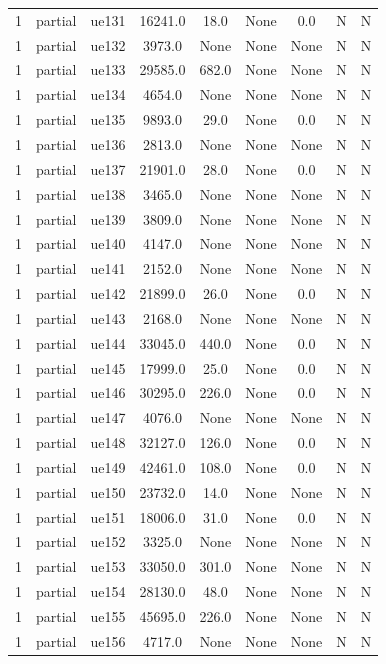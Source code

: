 \begin{table}[ht]
\begin{tabular}{|c|c|c|c|c|c|c|c|c|}
1 & partial & ue131 & 16241.0 & 18.0 & None & 0.0 & N & N \\
1 & partial & ue132 & 3973.0 & None & None & None & N & N \\
1 & partial & ue133 & 29585.0 & 682.0 & None & None & N & N \\
1 & partial & ue134 & 4654.0 & None & None & None & N & N \\
1 & partial & ue135 & 9893.0 & 29.0 & None & 0.0 & N & N \\
1 & partial & ue136 & 2813.0 & None & None & None & N & N \\
1 & partial & ue137 & 21901.0 & 28.0 & None & 0.0 & N & N \\
1 & partial & ue138 & 3465.0 & None & None & None & N & N \\
1 & partial & ue139 & 3809.0 & None & None & None & N & N \\
1 & partial & ue140 & 4147.0 & None & None & None & N & N \\
1 & partial & ue141 & 2152.0 & None & None & None & N & N \\
1 & partial & ue142 & 21899.0 & 26.0 & None & 0.0 & N & N \\
1 & partial & ue143 & 2168.0 & None & None & None & N & N \\
1 & partial & ue144 & 33045.0 & 440.0 & None & 0.0 & N & N \\
1 & partial & ue145 & 17999.0 & 25.0 & None & 0.0 & N & N \\
1 & partial & ue146 & 30295.0 & 226.0 & None & 0.0 & N & N \\
1 & partial & ue147 & 4076.0 & None & None & None & N & N \\
1 & partial & ue148 & 32127.0 & 126.0 & None & 0.0 & N & N \\
1 & partial & ue149 & 42461.0 & 108.0 & None & 0.0 & N & N \\
1 & partial & ue150 & 23732.0 & 14.0 & None & None & N & N \\
1 & partial & ue151 & 18006.0 & 31.0 & None & 0.0 & N & N \\
1 & partial & ue152 & 3325.0 & None & None & None & N & N \\
1 & partial & ue153 & 33050.0 & 301.0 & None & None & N & N \\
1 & partial & ue154 & 28130.0 & 48.0 & None & None & N & N \\
1 & partial & ue155 & 45695.0 & 226.0 & None & None & N & N \\
1 & partial & ue156 & 4717.0 & None & None & None & N & N \\

\end{tabular}
\end{table}

